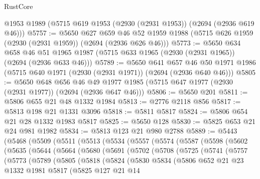\begin{lexlean}{RustCore}
\begin{coremodule}
    @1953
    @1989
    (@5715 @619 @1953 (@2930 (@2931 @1953)) (@2694 (@2936 @619 @46)))
@5757 := @5650
    @627
    @659
    @46
    @52
    @1959
    @1988
    (@5715 @626 @1959 (@2930 (@2931 @1959)) (@2694 (@2936 @626 @46)))
@5773 := @5650
    @634
    @658
    @46
    @51
    @1965
    @1987
    (@5715 @633 @1965 (@2930 (@2931 @1965)) (@2694 (@2936 @633 @46)))
@5789 := @5650
    @641
    @657
    @46
    @50
    @1971
    @1986
    (@5715 @640 @1971 (@2930 (@2931 @1971)) (@2694 (@2936 @640 @46)))
@5805 := @5650
    @648
    @656
    @46
    @49
    @1977
    @1985
    (@5715 @647 @1977 (@2930 (@2931 @1977)) (@2694 (@2936 @647 @46)))
@5806 := @5650 @201
@5811 := @5806 @655 @21 @48 @1332 @1984
@5813 := @2776 @2118 @856
@5817 := @5813 @198 @21 @1331 @3096
@5818 := @5811 @5817
@5824 := @5806 @654 @21 @28 @1332 @1983 @5817
@5825 := @5650 @128
@5830 := @5825 @653 @21 @24 @981 @1982
@5834 := @5813 @123 @21 @980 @2788
@5889 := @5443
    (@5468
      (@5509
        (@5511
          (@5513
            (@5534
              (@5557
                (@5574
                  (@5587
                    (@5598
                      (@5602
                        (@5635
                          (@5644
                            (@5664
                              (@5680
                                (@5691
                                  (@5702
                                    (@5708
                                      (@5725
                                        (@5741
                                          (@5757
                                            (@5773
                                              (@5789
                                                (@5805
                                                  (@5818
                                                    (@5824
                                                      (@5830
                                                        @5834
                                                        (@5806
                                                          @652
                                                          @21
                                                          @23
                                                          @1332
                                                          @1981
                                                          @5817
                                                          (@5825
                                                            @127
                                                            @21
                                                            @14

\end{coremodule}
\end{lexlean}
